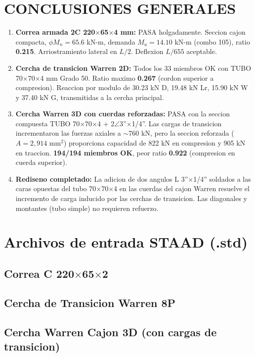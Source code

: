 \documentclass[12pt,a4paper]{article}
\begin{document}
\section{CONCLUSIONES GENERALES}
\begin{enumerate}
    \item \textbf{Correa armada 2C 220$\times$65$\times$4 mm:} \textcolor{secondary!80!black}{PASA} holgadamente.
          Seccion cajon compacta, $\phi M_n=65.6$ kN-m, demanda $M_u=14.10$ kN-m (combo 105),
          ratio \textbf{0.215}. Arriostramiento lateral en $L/2$. Deflexion $L/655$ aceptable.
    \item \textbf{Cercha de transicion Warren 2D:} Todos los 33 miembros OK con TUBO 70$\times$70$\times$4 mm
          Grado 50. Ratio maximo \textbf{0.267} (cordon superior a compresion). Reaccion por modulo
          de 30.23 kN D, 19.48 kN Lr, 15.90 kN W y 37.40 kN G, transmitidas a la cercha principal.
    \item \textbf{Cercha Warren 3D con cuerdas reforzadas:} \textcolor{secondary!80!black}{PASA} con la
          seccion compuesta TUBO 70$\times$70$\times$4 + 2$\angle$3''$\times$1/4''.
          Las cargas de transicion incrementaron las fuerzas axiales a $\sim$760 kN,
          pero la seccion reforzada ($A=2{,}914$ mm$^2$) proporciona capacidad de
          822 kN en compresion y 905 kN en traccion. \textbf{194/194 miembros OK},
          peor ratio \textbf{0.922} (compresion en cuerda superior).
    \item \textbf{Rediseno completado:} La adicion de dos angulos L 3''$\times$1/4'' soldados
          a las caras opuestas del tubo 70$\times$70$\times$4 en las cuerdas del cajon Warren
          resuelve el incremento de carga inducido por las cerchas de transicion.
          Las diagonales y montantes (tubo simple) no requieren refuerzo.
\end{enumerate}

\appendix
\section{Archivos de entrada STAAD (.std)}

\subsection{Correa C 220$\times$65$\times$2}
{\scriptsize\ttfamily}

\subsection{Cercha de Transicion Warren 8P}
{\scriptsize\ttfamily}

\subsection{Cercha Warren Cajon 3D (con cargas de transicion)}
{\scriptsize\ttfamily}
\end{document}
